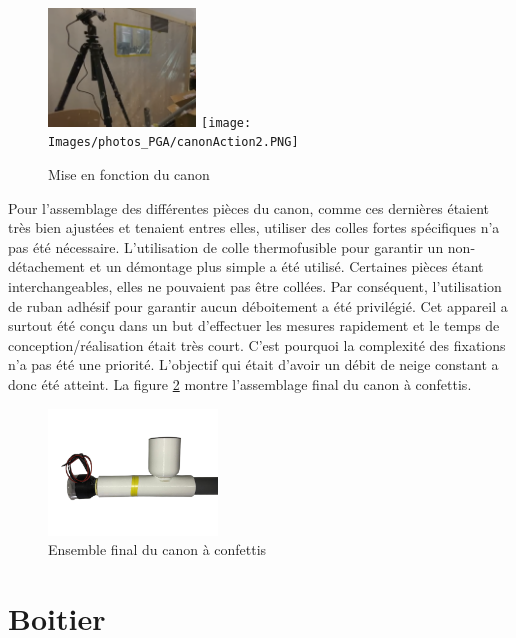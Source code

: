 \begin{figure}[H]
    \centering
    \includegraphics[width=0.35\textwidth]{Images/photos_PGA/canonAction1.PNG}
    \texttt{[image: Images/photos\_PGA/canonAction2.PNG]}
    \caption{Mise en fonction du canon}
    \label{fig:canonupdate}
\end{figure}

Pour l’assemblage des différentes pièces du canon, comme ces dernières étaient très bien ajustées et 
tenaient entres elles, utiliser des colles fortes spécifiques n’a pas été nécessaire. 
L’utilisation de colle thermofusible pour garantir un non-détachement et un démontage plus simple a été utilisé. 
Certaines pièces étant interchangeables, elles ne pouvaient pas être collées. Par conséquent, l’utilisation de ruban adhésif pour 
garantir aucun déboitement a été privilégié. Cet appareil a surtout été conçu dans un but d'effectuer 
les mesures rapidement et le temps de conception/réalisation était très court. C’est pourquoi la complexité 
des fixations n’a pas été une priorité. L’objectif qui était d’avoir un débit de neige constant a donc 
été atteint. La figure \ref{fig:canonensemble} montre l'assemblage final du canon à confettis.

\begin{figure}[H]
    \centering
    \includegraphics[width=0.4\textwidth]{Images/photos_PGA/canonComplpetv2-removebg-preview.png}
    \caption{Ensemble final du canon à confettis}
    \label{fig:canonensemble}
\end{figure}

\newpage
\section{Boitier}

